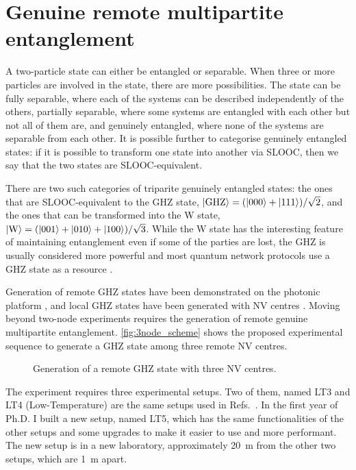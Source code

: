 \documentclass[a4paper, twoside]{article}
\begin{document}
\section{Genuine remote multipartite entanglement}
\label{sec:multipartite}
A two-particle state can either be entangled or separable. When three or more particles are involved in the state, there are more possibilities. The state can be fully separable, where each of the systems can be described independently of the others, partially separable, where some systems are entangled with each other but not all of them are, and genuinely entangled, where none of the systems are separable from each other.
It is possible further to categorise genuinely entangled states: if it is possible to transform one state into another via \ac{SLOOC}, then we say that the two states are \ac{SLOOC}-equivalent.

There are two such categories of triparite genuinely entangled states: the ones that are \ac{SLOOC}-equivalent to the \ac{GHZ} state, $\ket{\text{GHZ}} = (\ket{000} + \ket{111})/\sqrt 2 $, and the ones that can be transformed into the W state, $\ket{\text{W}} = (\ket{001} + \ket{010} + \ket{100})/\sqrt 3 $. While the W state has the interesting feature of maintaining entanglement even if some of the parties are lost, the \ac{GHZ} is usually considered more powerful and most quantum network protocols use a GHZ state as a resource . 

Generation of remote GHZ states have been demonstrated on the photonic platform \cite{Bouwmeester1999}, and local GHZ states have been generated with \ac{NV} centres . Moving beyond two-node experiments requires the generation of remote genuine multipartite entanglement. \autoref{fig:3node_scheme} shows the proposed experimental sequence to generate a GHZ state among three remote \ac{NV} centres.

\begin{figure}
	\caption{Generation of a remote GHZ state with three \ac{NV} centres.}
	\label{fig:3node_scheme}
\end{figure}

The experiment requires three experimental setups. Two of them, named LT3 and LT4 (Low-Temperature) are the same setups used in Refs.~\cite{Kalb2017, Humphreys2018}.
In the first year of Ph.D. I built a new setup, named LT5, which has the same functionalities of the other setups and some upgrades to make it easier to use and more performant. The new setup is in a new laboratory, approximately \SI{20}{m} from the other two setups, which are \SI{1}{m} apart.
\end{document}
